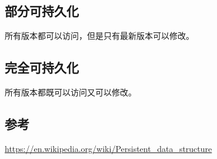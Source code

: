 
\subsection{部分可持久化}

所有版本都可以访问，但是只有最新版本可以修改。

\subsection{完全可持久化}

所有版本都既可以访问又可以修改。

\subsection{参考}

\url{https://en.wikipedia.org/wiki/Persistent_data_structure}
